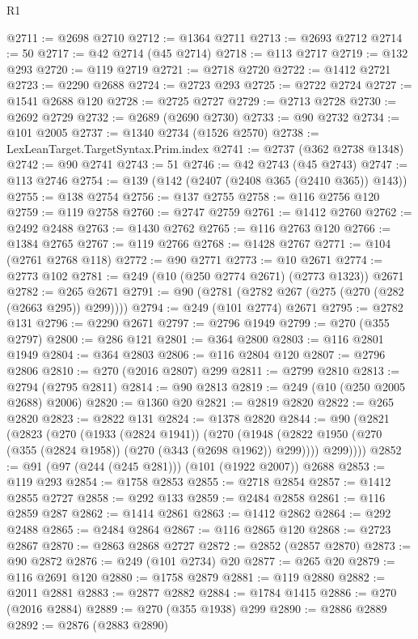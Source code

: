 \begin{lexlean}{R1}
\begin{coremodule}
@2711 := @2698 @2710
@2712 := @1364 @2711
@2713 := @2693 @2712
@2714 := 50
@2717 := @42 @2714 (@45 @2714)
@2718 := @113 @2717
@2719 := @132 @293
@2720 := @119 @2719
@2721 := @2718 @2720
@2722 := @1412 @2721
@2723 := @2290 @2688
@2724 := @2723 @293
@2725 := @2722 @2724
@2727 := @1541 @2688 @120
@2728 := @2725 @2727
@2729 := @2713 @2728
@2730 := @2692 @2729
@2732 := @2689 (@2690 @2730)
@2733 := @90 @2732
@2734 := @101 @2005
@2737 := @1340 @2734 (@1526 @2570)
@2738 := LexLeanTarget.TargetSyntax.Prim.index
@2741 := @2737 (@362 @2738 @1348)
@2742 := @90 @2741
@2743 := 51
@2746 := @42 @2743 (@45 @2743)
@2747 := @113 @2746
@2754 := @139 (@142 (@2407 (@2408 @365 (@2410 @365)) @143))
@2755 := @138 @2754
@2756 := @137 @2755
@2758 := @116 @2756 @120
@2759 := @119 @2758
@2760 := @2747 @2759
@2761 := @1412 @2760
@2762 := @2492 @2488
@2763 := @1430 @2762
@2765 := @116 @2763 @120
@2766 := @1384 @2765
@2767 := @119 @2766
@2768 := @1428 @2767
@2771 := @104 (@2761 @2768 @118)
@2772 := @90 @2771
@2773 := @10 @2671
@2774 := @2773 @102
@2781 := @249 (@10 (@250 @2774 @2671) (@2773 @1323)) @2671
@2782 := @265 @2671
@2791 := @90 (@2781 (@2782 @267 (@275 (@270 (@282 (@2663 @295)) @299))))
@2794 := @249 (@101 @2774) @2671
@2795 := @2782 @131
@2796 := @2290 @2671
@2797 := @2796 @1949
@2799 := @270 (@355 @2797)
@2800 := @286 @121
@2801 := @364 @2800
@2803 := @116 @2801 @1949
@2804 := @364 @2803
@2806 := @116 @2804 @120
@2807 := @2796 @2806
@2810 := @270 (@2016 @2807) @299
@2811 := @2799 @2810
@2813 := @2794 (@2795 @2811)
@2814 := @90 @2813
@2819 := @249 (@10 (@250 @2005 @2688) @2006)
@2820 := @1360 @20
@2821 := @2819 @2820
@2822 := @265 @2820
@2823 := @2822 @131
@2824 := @1378 @2820
@2844 := @90
    (@2821
      (@2823
        (@270
          (@1933 (@2824 @1941))
          (@270
            (@1948 (@2822 @1950 (@270 (@355 (@2824 @1958)) (@270 (@343 (@2698 @1962)) @299))))
            @299))))
@2852 := @91 (@97 (@244 (@245 @281))) (@101 (@1922 @2007)) @2688
@2853 := @119 @293
@2854 := @1758 @2853
@2855 := @2718 @2854
@2857 := @1412 @2855 @2727
@2858 := @292 @133
@2859 := @2484 @2858
@2861 := @116 @2859 @287
@2862 := @1414 @2861
@2863 := @1412 @2862
@2864 := @292 @2488
@2865 := @2484 @2864
@2867 := @116 @2865 @120
@2868 := @2723 @2867
@2870 := @2863 @2868 @2727
@2872 := @2852 (@2857 @2870)
@2873 := @90 @2872
@2876 := @249 (@101 @2734) @20
@2877 := @265 @20
@2879 := @116 @2691 @120
@2880 := @1758 @2879
@2881 := @119 @2880
@2882 := @2011 @2881
@2883 := @2877 @2882
@2884 := @1784 @1415
@2886 := @270 (@2016 @2884)
@2889 := @270 (@355 @1938) @299
@2890 := @2886 @2889
@2892 := @2876 (@2883 @2890)

\end{coremodule}
\end{lexlean}
